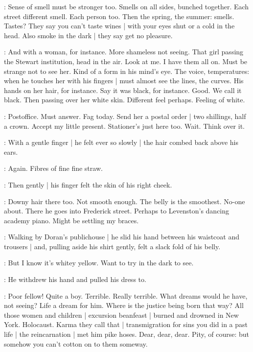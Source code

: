 \BloomInt:
Sense of smell must be stronger too.
Smells on all sides, bunched together.
Each street different smell.
Each person too.
Then the spring, the summer:
smells.
Tastes?
They say you can't taste wines |
with your eyes shut or a cold in the head.
Also smoke in the dark |
they say get no pleasure.

\BloomInt:
And with a woman, for instance.
More shameless not seeing.
That girl passing the Stewart institution,
head in the air.
Look at me.
I have them all on.
Must be strange not to see her.
Kind of a form in his mind's eye.
The voice, temperatures:
when he touches her with his fingers |
must almost see the lines, the curves.
His hands on her hair, for instance.
Say it was black, for instance.
Good.
We call it black.
Then passing over her white skin.
Different feel perhaps.
Feeling of white.

\BloomInt:
Postoffice.
Must answer.
Fag today.
Send her a postal order |
two shillings, half a crown.
Accept my little present.
Stationer's just here too.
Wait.
Think over it.

:
With a gentle finger |
he felt ever so slowly |
the hair combed back above his ears.

\BloomInt:
Again.
Fibres of fine fine straw.

:
Then gently |
his finger felt the skin of his right cheek.

\BloomInt:
Downy hair there too.
Not smooth enough.
The belly is the smoothest.
No-one about.
There he goes into Frederick street.
Perhaps to Levenston's dancing academy piano.
Might be settling my braces.

:
Walking by Doran's publichouse |
he slid his hand between his waistcoat and trousers |
and, pulling aside his shirt gently,
felt a slack fold of his belly.

\BloomInt:
But I know it's whitey yellow.
Want to try in the dark to see.

:
He withdrew his hand and pulled his dress to.

\BloomInt:
Poor fellow!
Quite a boy.
Terrible.
Really terrible.
What dreams would he have,
not seeing?
Life a dream for him.
Where is the justice being born that way?
All those women and children |
excursion beanfeast |
burned and drowned in New York.
Holocaust.
Karma they call that |
transmigration for sins you did in a past life |
the reincarnation |
met him pike hoses.
Dear, dear, dear.
Pity, of course:
but somehow you can't cotton on to them someway.%

